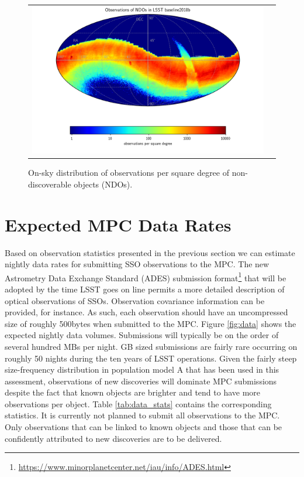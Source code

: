 \begin{figure}[tb!]
\begin{center}
\begin{tabular}{cc}
\includegraphics[width=0.80\linewidth]{figs/mba_obs_hp_ndo.png} &
\end{tabular}
\end{center}
\caption{On-sky distribution of observations per square degree of non-discoverable objects (NDOs).  }
\label{fig:ndo_obs_sky}       %
\end{figure}


\section{Expected \gls{MPC} Data Rates}\label{sec:data}
Based on observation statistics presented in the previous section we can estimate nightly data rates for submitting \gls{SSO} observations to the \gls{MPC}. The new Astrometry Data Exchange Standard (\gls{ADES}) submission format\footnote{\url{https://www.minorplanetcenter.net/iau/info/ADES.html}} that will be adopted by the time \gls{LSST} goes on line permits a more detailed description of optical observations of SSOs. Observation covariance information can be provided, for instance. As such, each observation should have an uncompressed size of roughly 500bytes when submitted to the \gls{MPC}. Figure \ref{fig:data} shows the expected nightly data volumes. Submissions will typically be on the order of several hundred MBs per night. \gls{GB} sized submissions are fairly rare occurring on roughly 50 nights during the ten years of \gls{LSST} operations. Given the fairly steep size-frequency distribution in population model A that has been used in this assessment, observations of new discoveries will dominate \gls{MPC} submissions despite the fact that known objects are brighter and tend to have more observations per object. Table \ref{tab:data_stats} contains the corresponding statistics. It is currently not planned to submit all observations to the \gls{MPC}. Only observations
that can be linked to known objects and those that can be confidently attributed to new discoveries are to be delivered.


